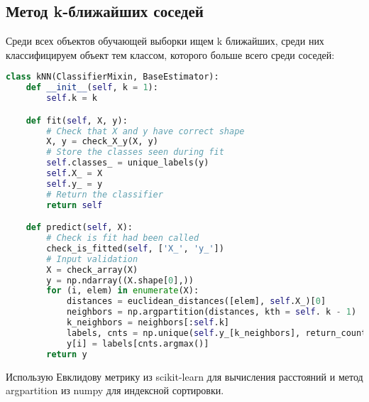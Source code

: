 \subsection{Метод k-ближайших соседей}
Среди всех объектов обучающей выборки ищем k ближайших, среди них классифицируем объект тем классом, которого больше всего среди соседей:
\begin{lstlisting}[language=Python]
class kNN(ClassifierMixin, BaseEstimator):
    def __init__(self, k = 1):
        self.k = k

    def fit(self, X, y):
        # Check that X and y have correct shape
        X, y = check_X_y(X, y)
        # Store the classes seen during fit
        self.classes_ = unique_labels(y)
        self.X_ = X
        self.y_ = y
        # Return the classifier
        return self

    def predict(self, X):
        # Check is fit had been called
        check_is_fitted(self, ['X_', 'y_'])
        # Input validation
        X = check_array(X)
        y = np.ndarray((X.shape[0],))
        for (i, elem) in enumerate(X):
            distances = euclidean_distances([elem], self.X_)[0]
            neighbors = np.argpartition(distances, kth = self. k - 1)
            k_neighbors = neighbors[:self.k]
            labels, cnts = np.unique(self.y_[k_neighbors], return_counts = True)
            y[i] = labels[cnts.argmax()]
        return y
\end{lstlisting}
Использую Евклидову метрику из scikit-learn для вычисления расстояний и метод argpartition из numpy \cite{numpy-argpart} для индексной сортировки.
\pagebreak

